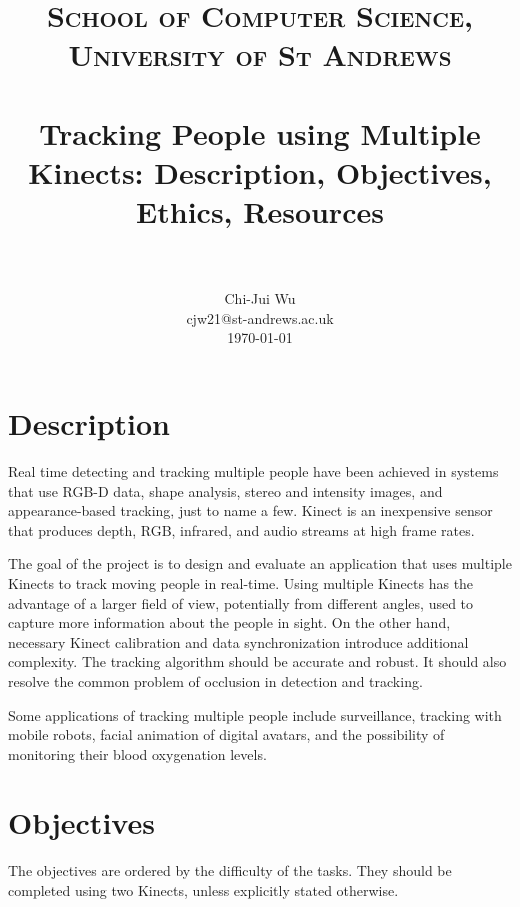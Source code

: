 \documentclass[paper=a4, fontsize=11pt]{scrartcl}
\title{
		\vspace{-7ex}
		\usefont{OT1}{bch}{b}{n}
		\normalfont \normalsize \textsc{School of Computer Science, University of St Andrews} \\ [25pt]
		\horrule{0.5pt} \\[0.2cm]
		\huge Tracking People using Multiple Kinects: Description, Objectives, Ethics, Resources \\
		\horrule{2pt} \\[0.2cm]
		\vspace{-2ex}
}
\author{
		\normalfont \normalsize
        Chi-Jui Wu\\[-3pt] \normalsize
        {cjw21@st-andrews.ac.uk}\\[-3pt] \normalsize
        \today
}
\date{}
\numberwithin{equation}{section}
\numberwithin{figure}{section}
\numberwithin{table}{section}
\begin{document}
\maketitle

\section{Description}

Real time detecting and tracking multiple people have been achieved in systems that use RGB-D data\cite{track_rgbd}, shape analysis, stereo and intensity images\cite{w4s}, and appearance-based tracking\cite{track_robust}, just to name a few. Kinect is an inexpensive sensor that produces depth, RGB, infrared, and audio streams at high frame rates.

The goal of the project is to design and evaluate an application that uses multiple Kinects to track moving people in real-time. Using multiple Kinects has the advantage of a larger field of view, potentially from different angles, used to capture more information about the people in sight. On the other hand, necessary Kinect calibration and data synchronization introduce additional complexity. The tracking algorithm should be accurate and robust. It should also resolve the common problem of occlusion in detection and tracking.

Some applications of tracking multiple people include surveillance\cite{surveillance}, tracking with mobile robots\cite{mobile}, facial animation of digital avatars\cite{facial_animation}, and the possibility of monitoring their blood oxygenation levels.

\section{Objectives}

The objectives are ordered by the difficulty of the tasks. They should be completed using two Kinects, unless explicitly stated otherwise.
\end{document}

